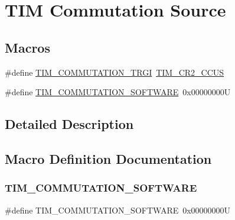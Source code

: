\hypertarget{group___t_i_m___commutation___source}{}\section{T\+IM Commutation Source}
\label{group___t_i_m___commutation___source}
\subsection*{Macros}
\begin{DoxyCompactItemize}
\item 
\#define \hyperlink{group___t_i_m___commutation___source_gab2e11763b5e061a5b3056ac970f57ab1}{T\+I\+M\+\_\+\+C\+O\+M\+M\+U\+T\+A\+T\+I\+O\+N\+\_\+\+T\+R\+GI}~\hyperlink{group___peripheral___registers___bits___definition_gaf0328c1339b2b1633ef7a8db4c02d0d5}{T\+I\+M\+\_\+\+C\+R2\+\_\+\+C\+C\+US}
\item 
\#define \hyperlink{group___t_i_m___commutation___source_ga9cd117a69cbca219c1cf29e74746a496}{T\+I\+M\+\_\+\+C\+O\+M\+M\+U\+T\+A\+T\+I\+O\+N\+\_\+\+S\+O\+F\+T\+W\+A\+RE}~0x00000000U
\end{DoxyCompactItemize}


\subsection{Detailed Description}


\subsection{Macro Definition Documentation}
\mbox{\label{group___t_i_m___commutation___source_ga9cd117a69cbca219c1cf29e74746a496}} 
\subsubsection{\texorpdfstring{T\+I\+M\+\_\+\+C\+O\+M\+M\+U\+T\+A\+T\+I\+O\+N\+\_\+\+S\+O\+F\+T\+W\+A\+RE}{TIM\_COMMUTATION\_SOFTWARE}}
{\footnotesize\ttfamily \#define T\+I\+M\+\_\+\+C\+O\+M\+M\+U\+T\+A\+T\+I\+O\+N\+\_\+\+S\+O\+F\+T\+W\+A\+RE~0x00000000U}

